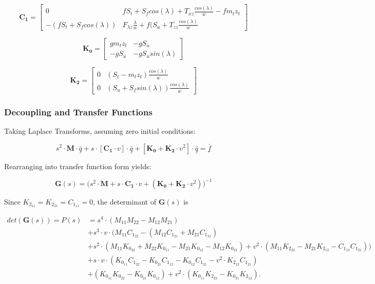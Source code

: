 \documentclass[a4paper]{article}
\begin{document}
\begin{equation}
\mathbf{C_1} = \begin{bmatrix}
0 & f S_t + S_f cos(\lambda) + T_{xz} \frac{cos(\lambda)}{w} - f m_t z_t \\
-(f S_t + S_f cos(\lambda)) & F_{\lambda z} \frac{\lambda}{w} + f (S_u + T_{zz} \frac{cos(\lambda)}{w}
\end{bmatrix}
\end{equation}

\begin{equation}
\mathbf{K_0} = \begin{bmatrix}
g m_t z_t & -g S_u \\
-g S_u & -g S_u sin(\lambda)
\end{bmatrix}
\end{equation}

\begin{equation}
\mathbf{K_2} = \begin{bmatrix}
0 & (S_t - m_t z_t) \frac{cos(\lambda)}{w} \\
0 & (S_u + S_f sin(\lambda)) \frac{cos(\lambda)}{w}
\end{bmatrix}
\end{equation}

\subsubsection{Decoupling and Transfer Functions}

Taking Laplace Transforms, assuming zero initial conditions:

\begin{equation*}
s^2 \cdot \mathbf{M} \cdot \underline{\bar{q}} + s \cdot [\mathbf{C_1} \cdot v] \cdot \underline{\bar{q}} + [\mathbf{K_0} + \mathbf{K_2} \cdot v^2] \cdot \underline{\bar{q}} = \underline{\bar{f}} 
\end{equation*}

\noindent Rearranging into transfer function form yields:

\begin{equation}
\mathbf{G}(s) = \Big(s^2 \cdot \mathbf{M} + s \cdot \mathbf{C_1} \cdot v + (\mathbf{K_0} + \mathbf{K_2} \cdot v^2) \Big)^{-1}
\end{equation}

\noindent Since $K_{2_{11}}=K_{2_{21}}=C_{1_{11}}=0$, the determinant of $\mathbf{G}(s)$ is

\begin{align*}
det(\mathbf{G}(s)) = P(s) &= s^4 \cdot (M_{11} M_{22} - M_{12} M_{21}) \\
&+ s^3 \cdot v \cdot (M_{11} C_{1_{22}} - (M_{12} C_{1_{21}} + M_{21} C_{1_{12}}) \\
&+ s^2 \cdot (M_{11} K_{0_{22}} + M_{22} K_{0_{11}} - M_{21} K_{0_{12}} - M_{12} K_{0_{21}}) + v^2 \cdot (M_{11} K_{2_{22}} - M_{21} K_{2_{12}} - C_{1_{12}} C_{1_{21}})) \\
&+ s \cdot v \cdot (K_{0_{11}} C_{1_{22}} - K_{0_{21}} C_{1_{12}} - K_{0_{12}} C_{1_{21}} - v^2 \cdot K_{2_{12}} C_{1_{21}}) \\
&+ (K_{0_{11}} K_{0_{22}} - K_{0_{21}} K_{0_{12}}) + v^2 \cdot (K_{0_{11}} K_{2_{22}} - K_{0_{21}} K_{2_{12}}).
\end{align*}
\end{document}
